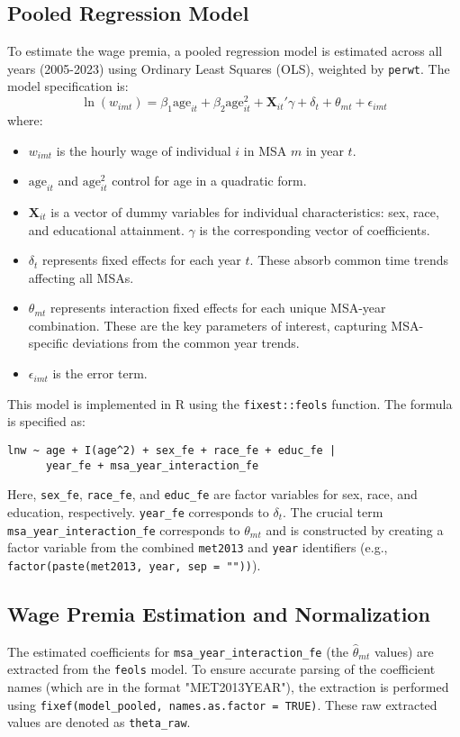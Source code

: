 \documentclass{article}
\begin{document}
\subsection{Pooled Regression Model}
To estimate the wage premia, a pooled regression model is estimated across all years (2005-2023) using Ordinary Least Squares (OLS), weighted by \texttt{perwt}. The model specification is:
\begin{equation}
    \ln(w_{imt}) = \beta_1 \text{age}_{it} + \beta_2 \text{age}_{it}^2 + \mathbf{X}_{it}'\gamma + \delta_t + \theta_{mt} + \epsilon_{imt}
    \label{eq:pooled_regression}
\end{equation}
where:
\begin{itemize}
    \item $w_{imt}$ is the hourly wage of individual $i$ in MSA $m$ in year $t$.
    \item $\text{age}_{it}$ and $\text{age}_{it}^2$ control for age in a quadratic form.
    \item $\mathbf{X}_{it}$ is a vector of dummy variables for individual characteristics: sex, race, and educational attainment. $\gamma$ is the corresponding vector of coefficients.
    \item $\delta_t$ represents fixed effects for each year $t$. These absorb common time trends affecting all MSAs.
    \item $\theta_{mt}$ represents interaction fixed effects for each unique MSA-year combination. These are the key parameters of interest, capturing MSA-specific deviations from the common year trends.
    \item $\epsilon_{imt}$ is the error term.
\end{itemize}
This model is implemented in R using the \texttt{fixest::feols} function. The formula is specified as:
\begin{verbatim}
lnw ~ age + I(age^2) + sex_fe + race_fe + educ_fe | 
      year_fe + msa_year_interaction_fe
\end{verbatim}
Here, \texttt{sex\_fe}, \texttt{race\_fe}, and \texttt{educ\_fe} are factor variables for sex, race, and education, respectively. \texttt{year\_fe} corresponds to $\delta_t$. The crucial term \texttt{msa\_year\_interaction\_fe} corresponds to $\theta_{mt}$ and is constructed by creating a factor variable from the combined \texttt{met2013} and \texttt{year} identifiers (e.g., \texttt{factor(paste(met2013, year, sep = "\textunderscore"))}).

\subsection{Wage Premia Estimation and Normalization}
The estimated coefficients for \texttt{msa\_year\_interaction\_fe} (the $\hat{\theta}_{mt}$ values) are extracted from the \texttt{feols} model. To ensure accurate parsing of the coefficient names (which are in the format "MET2013\textunderscore YEAR"), the extraction is performed using \texttt{fixef(model\_pooled, names.as.factor = TRUE)}. These raw extracted values are denoted as \texttt{theta\_raw}.
\end{document}
